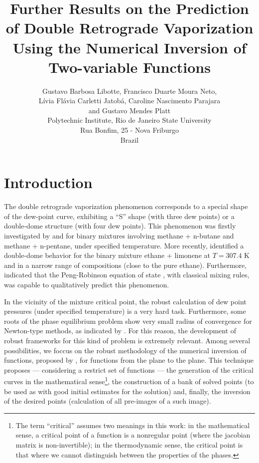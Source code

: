 \documentclass{article}
\title{Further Results on the Prediction of Double Retrograde Vaporization Using the Numerical Inversion of Two-variable Functions}
\author{Gustavo Barbosa Libotte, Francisco Duarte Moura Neto,\\
L\'{i}via Fl\'{a}via Carletti Jatob\'{a}, Caroline Nascimento Parajara \\ and Gustavo Mendes Platt\\
  \small Polytechnic Institute, Rio de Janeiro State University\\
  \small Rua Bonfim, 25 - Nova Friburgo\\
  \small Brazil
}
\theoremstyle{definition}
\theoremstyle{remark}
\begin{document}
\maketitle


\section{Introduction}

The double retrograde vaporization phenomenon corresponds to a special shape of the dew-point curve, exhibiting a ``S'' shape (with three dew points) or a double-dome structure (with four dew points). This phenomenon was firstly investigated by \cite{chen_1} and \cite{chen_2} for binary mixtures involving methane + n-butane and methane + n-pentane, under specified temperature. More recently, \cite{raeissi_1} identified a double-dome behavior for the binary mixture ethane + limonene at $T = 307.4$ K and in a narrow range of compositions (close to the pure ethane). Furthermore, \cite{raeissi_2} indicated that the Peng-Robinson equation of state \cite{peng_robinson}, with classical mixing rules, was capable to qualitatively predict this phenomenon.

In the vicinity of the mixture critical point, the robust calculation of dew point pressures (under specified temperature) is a very hard task. Furthermore, some roots of the phase equilibrium problem show very small radius of convergence for Newton-type methods, as indicated by \cite{jnsa}. For this reason, the development of robust frameworks for this kind of problem is extremely relevant. Among several possibilities, we foccus on the robust methodology of the numerical inversion of functions, proposed by \cite{malta}, for functions from
the plane to the plane. This technique \cite{malta} proposes --- considering a restrict set of functions --- the generation of the critical curves in the mathematical 
sense\footnote{The term ``critical''  assumes two meanings in this work: in the mathematical sense, a critical point of a function
 is a nonregular point (where the jacobian matrix is non-invertible); in the thermodynamic sense, the critical point is that where we cannot distinguish between the properties of the phases.}, the construction of a bank of solved points (to be used as 
 with good initial estimates for the solution) and, finally, the inversion of the desired points (calculation of all pre-images of a such image).
\end{document}
